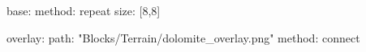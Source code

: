 base:
  method: repeat
  size: [8,8]

overlay:
  path: "Blocks/Terrain/dolomite_overlay.png"
  method: connect